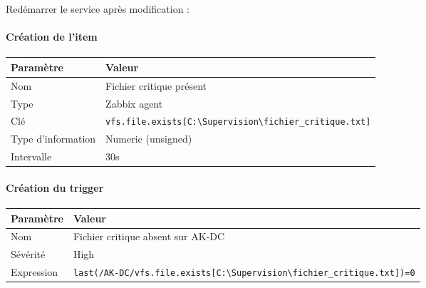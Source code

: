 \begin{Shaded}
\begin{Highlighting}[]
\OtherTok{=}
\end{Highlighting}
\end{Shaded}

Redémarrer le service après modification :

\begin{Shaded}
\begin{Highlighting}[]
 
\end{Highlighting}
\end{Shaded}

\paragraph{Création de l'item}\label{cruxe9ation-de-litem-1}

{\def\LTcaptype{none} %
\begin{longtable}[]{@{}ll@{}}
\toprule\noalign{}
Paramètre & Valeur \\
\midrule\noalign{}
\endhead
\bottomrule\noalign{}
\endlastfoot
Nom & Fichier critique présent \\
Type & Zabbix agent \\
Clé &
\texttt{vfs.file.exists{[}C:\textbackslash{}Supervision\textbackslash{}fichier\_critique.txt{]}} \\
Type d'information & Numeric (unsigned) \\
Intervalle & 30s \\
\end{longtable}
}

\paragraph{Création du trigger}\label{cruxe9ation-du-trigger-1}

{\def\LTcaptype{none} %
\begin{longtable}[]{@{}
  >{\raggedright\arraybackslash}p{}
  >{\raggedright\arraybackslash}p{}@{}}
\toprule\noalign{}
\begin{minipage}[b]{\linewidth}\raggedright
Paramètre
\end{minipage} & \begin{minipage}[b]{\linewidth}\raggedright
Valeur
\end{minipage} \\
\midrule\noalign{}
\endhead
\bottomrule\noalign{}
\endlastfoot
Nom & Fichier critique absent sur AK-DC \\
Sévérité & High \\
Expression &
\texttt{last(/AK-DC/vfs.file.exists{[}C:\textbackslash{}Supervision\textbackslash{}fichier\_critique.txt{]})=0} \\
\end{longtable}
}

